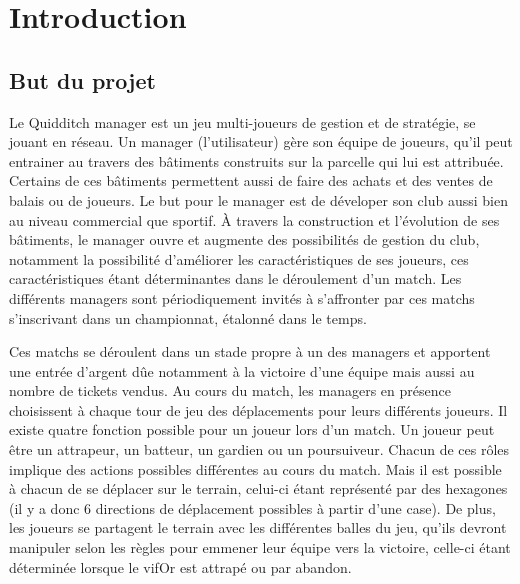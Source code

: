 \documentclass[a4paper,titlepage]{scrreprt}
\begin{document}
\tableofcontents
\chapter{Introduction}
\section{But du projet}
  Le \gls{Quidditch} \gls{manager} est un jeu multi-joueurs de gestion
  et de stratégie, se jouant en réseau.
  Un manager (l'utilisateur) gère son équipe de \gls{joueur}s, qu'il peut entrainer
  au travers des bâtiments construits sur la parcelle qui lui est attribuée. Certains de ces bâtiments permettent aussi de faire des achats et des ventes de balais ou de joueurs.
  Le but pour le manager est de déveloper son \gls{club} aussi bien au niveau commercial
  que sportif.
  À travers la construction et l'évolution de ses bâtiments, le manager ouvre et
  augmente des possibilités de gestion du club, notamment la possibilité
  d'améliorer les caractéristiques de ses joueurs, ces caractéristiques
  étant déterminantes dans le déroulement d'un match.
  Les différents managers sont périodiquement invités à s'affronter par
  ces \gls{match}s s'inscrivant dans un championnat, étalonné dans le temps. 
  
  Ces matchs se déroulent
  dans un stade propre à un des managers et apportent une entrée d'argent
  dûe notamment à la victoire d'une équipe mais aussi au nombre de tickets vendus.
  Au cours du match, les managers en présence choisissent à chaque tour de jeu
  des déplacements pour leurs différents joueurs. Il existe quatre fonction possible
  pour un joueur lors d'un match. Un joueur peut être un \gls{attrapeur}, un \gls{batteur}, un \gls{gardien}
  ou un \gls{poursuiveur}.
  Chacun de ces rôles implique des actions possibles différentes au cours du match.
  Mais il est possible à chacun de se déplacer sur le terrain, celui-ci étant représenté par
  des hexagones (il y a donc 6 directions de déplacement possibles à partir d'une case).
  De plus, les joueurs se partagent le terrain avec les différentes balles du jeu, 
  qu'ils devront manipuler selon les règles pour emmener leur équipe vers la victoire,
  celle-ci étant déterminée lorsque le \gls{vifOr} est attrapé ou par abandon.
\end{document}
